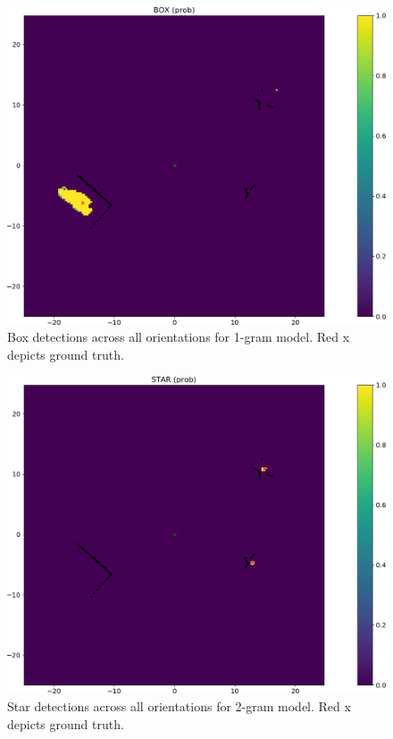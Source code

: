 %
\begin{figure}
  \centering
  \includegraphics[width=\columnwidth]{figures/box_1gram.png}
  \caption{Box detections across all orientations for 1-gram model. Red x
    depicts ground truth.}
  \label{fig:box_1gram}
\end{figure}
%
\begin{figure}
  \centering
  \includegraphics[width=\columnwidth]{figures/star_2gram.png}
  \caption{Star detections across all orientations for 2-gram model. Red x
    depicts ground truth.}
  \label{fig:star_2gram}
\end{figure}

